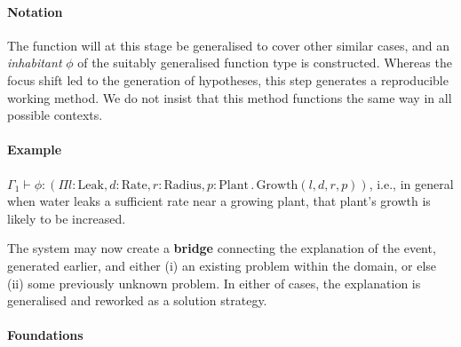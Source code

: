 \paragraph{\textbf{\upshape Notation}}
The function will at this stage be generalised to cover other similar
cases, and an \emph{inhabitant} $\phi$ of the suitably generalised
function type is constructed.  Whereas the focus shift led to the
generation of hypotheses, this step generates a reproducible working
method.  We do not insist that this method functions the same way in
all possible contexts.

\paragraph{\textbf{\upshape Example}}
$\Gamma_1 \vdash \phi : (\Pi l:\mathrm{Leak}, d:\mathrm{Rate},
r:\mathrm{Radius}, p:\mathrm{Plant} \mathbin{.}
\mathrm{Growth}(l,d,r,p))$, i.e., in general when water leaks a
sufficient rate near a growing plant, that plant's growth is likely to
be increased.

\begin{center}
\asterism
\end{center}

\begin{defn}\label{def:bridge}
\hypertarget{def:bridge}{}The system may now create a \textbf{bridge}
connecting the explanation of the event, generated earlier, and either
(i) an existing problem within the domain, or else (ii) some
previously unknown problem.  In either of cases, the explanation is
generalised and reworked as a solution strategy.
\end{defn}
\paragraph{\textbf{\upshape Foundations}}
                                         
